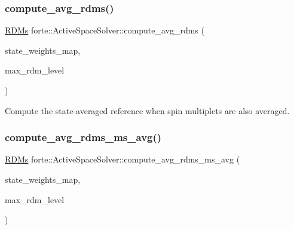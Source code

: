 \mbox{\label{classforte_1_1_active_space_solver_aeab569a38a2caee72f8f9967438f3e15}} 
\subsubsection{\texorpdfstring{compute\+\_\+avg\+\_\+rdms()}{compute\_avg\_rdms()}}
{\footnotesize\ttfamily \mbox{\hyperlink{classforte_1_1_r_d_ms}{R\+D\+Ms}} forte\+::\+Active\+Space\+Solver\+::compute\+\_\+avg\+\_\+rdms (\begin{DoxyParamCaption}\item[{const std\+::map$<$ \mbox{\hyperlink{classforte_1_1_state_info}{State\+Info}}, std\+::vector$<$ double $>$$>$ \&}]{state\+\_\+weights\+\_\+map,  }\item[{int}]{max\+\_\+rdm\+\_\+level }\end{DoxyParamCaption})\hspace{0.3cm}{\ttfamily [protected]}}



Compute the state-\/averaged reference when spin multiplets are also averaged. 

\mbox{\label{classforte_1_1_active_space_solver_a851a96efeeb246b31117548fafbc2271}} 
\subsubsection{\texorpdfstring{compute\+\_\+avg\+\_\+rdms\+\_\+ms\+\_\+avg()}{compute\_avg\_rdms\_ms\_avg()}}
{\footnotesize\ttfamily \mbox{\hyperlink{classforte_1_1_r_d_ms}{R\+D\+Ms}} forte\+::\+Active\+Space\+Solver\+::compute\+\_\+avg\+\_\+rdms\+\_\+ms\+\_\+avg (\begin{DoxyParamCaption}\item[{const std\+::map$<$ \mbox{\hyperlink{classforte_1_1_state_info}{State\+Info}}, std\+::vector$<$ double $>$$>$ \&}]{state\+\_\+weights\+\_\+map,  }\item[{int}]{max\+\_\+rdm\+\_\+level }\end{DoxyParamCaption})\hspace{0.3cm}{\ttfamily [protected]}}



